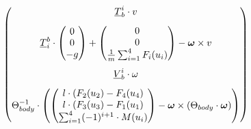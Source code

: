 \begin{align*}
\begin{pmatrix}
	\underline{T}_b^i \cdot v 
	\\[0.8em]
	\underline{T}_i^b \cdot \begin{pmatrix}0\\0\\-g	\end{pmatrix} + \begin{pmatrix}0\\0\\ \frac{1}{m}\sum_{i=1}^4 F_i(u_{i})	\end{pmatrix} - \boldsymbol{\omega} \times v 
	\\[2em]
	\underline{V}_b^i \cdot \omega
	\\[0.8em]
	\Theta_{body}^{-1} \cdot \left( \begin{pmatrix} l \cdot \left(F_2(u_{2}) - F_4(u_{4} \right)  \\ l \cdot \left(F_3(u_{3}) - F_1(u_{1} \right)  \\ \sum_{i=1}^4 (-1)^{i+1} \cdot M(u_{i}) \end{pmatrix} - \boldsymbol{\omega} \times \left( \Theta_{body} \cdot \boldsymbol{\omega} \right) \right)
	\end{pmatrix}
\end{align*}

